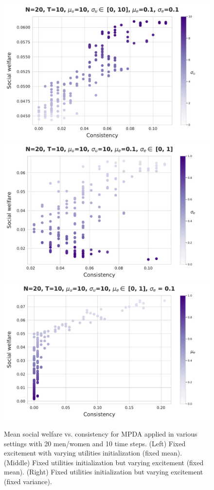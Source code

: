 \begin{figure}
    \centering
    \includegraphics[width=0.32\linewidth]{figures/mpda_dynamics_initliazation.pdf}
    \includegraphics[width=0.32\linewidth]{figures/mpda_dynamics_excitement_std.pdf}
    \includegraphics[width=0.32\linewidth]{figures/mpda_dynamics_excitement_mean.pdf}
     \caption{Mean social welfare vs. consistency for MPDA applied in various settings with 20 men/women and 10 time steps. (Left) Fixed excitement with varying utilities initialization (fixed mean). (Middle) Fixed utilities initialization but varying excitement (fixed mean). (Right) Fixed utilities initialization but varying excitement (fixed variance).}
    \label{fig:mpda_dynamics}
\end{figure}
